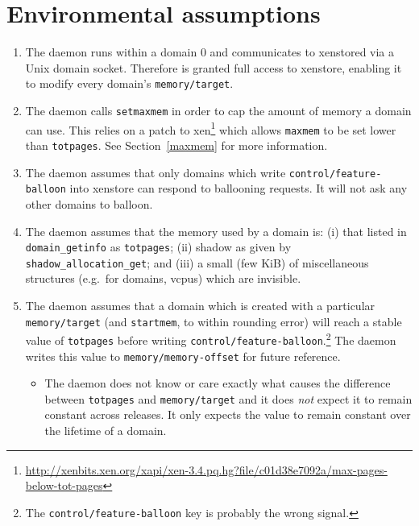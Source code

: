 \documentclass{article}
\begin{document}
\section{Environmental assumptions}
\label{assumptions}
\begin{enumerate}
\item The \squeezed{} daemon runs within a \xen{} domain 0 and communicates to xenstored via a Unix domain socket. Therefore \squeezed{} is granted full access to xenstore, enabling it to modify every domain's \texttt{memory/target}.

\item The \squeezed{} daemon calls \texttt{setmaxmem} in order to cap the amount of memory a domain can use. This relies on a patch to xen\footnote{\url{http://xenbits.xen.org/xapi/xen-3.4.pq.hg?file/c01d38e7092a/max-pages-below-tot-pages}} which allows \texttt{maxmem}
 to be set lower than \texttt{totpages}. See Section~\ref{maxmem} for more information.

\item The \squeezed{} daemon assumes that only domains which write \texttt{control/feature-balloon} into xenstore can respond to ballooning requests. It will not ask any other domains to balloon.

\item The \squeezed{} daemon assumes that the memory used by a domain is: (i) that listed in \texttt{domain\_getinfo} as \texttt{totpages}; (ii) shadow as given by \texttt{shadow\_allocation\_get}; and (iii) a small (few KiB) of miscellaneous \xen{} structures (e.g.\ for domains, vcpus) which are invisible.

\item The \squeezed{} daemon assumes that a domain which is created with a particular \texttt{memory/target} (and \texttt{startmem}, to within rounding error) will reach a stable value of \texttt{totpages} before writing \texttt{control/feature-balloon}.\footnote{%
The \texttt{control/feature-balloon} key is probably the wrong signal.
}%
The daemon writes this value to \texttt{memory/memory-offset} for future reference.
\begin{itemize}
\item The \squeezed{} daemon does not know or care exactly what causes the difference between \texttt{totpages} and \texttt{memory/target} and it does {\em not} expect it to remain constant across \xen{} releases. It only expects the value to remain constant over the lifetime of a domain.
\end{itemize}


\end{enumerate}
\end{document}
